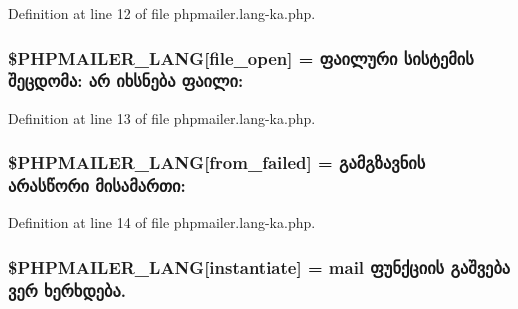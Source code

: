 Definition at line 12 of file phpmailer.\+lang-\/ka.\+php.

\subsubsection[{\texorpdfstring{\$\+P\+H\+P\+M\+A\+I\+L\+E\+R\+\_\+\+L\+A\+NG}{$PHPMAILER_LANG}}]{\setlength{\rightskip}{0pt plus 5cm}\$P\+H\+P\+M\+A\+I\+L\+E\+R\+\_\+\+L\+A\+NG\mbox{[}\textquotesingle{}file\+\_\+open\textquotesingle{}\mbox{]} = \textquotesingle{}ფაილური სისტემის შეცდომა\+: არ იხსნება ფაილი\+: \textquotesingle{}}\hypertarget{phpmailer_8lang-ka_8php_a28d1a6517bf4c942a0ddd506188ad2e0}{}\label{phpmailer_8lang-ka_8php_a28d1a6517bf4c942a0ddd506188ad2e0}


Definition at line 13 of file phpmailer.\+lang-\/ka.\+php.

\subsubsection[{\texorpdfstring{\$\+P\+H\+P\+M\+A\+I\+L\+E\+R\+\_\+\+L\+A\+NG}{$PHPMAILER_LANG}}]{\setlength{\rightskip}{0pt plus 5cm}\$P\+H\+P\+M\+A\+I\+L\+E\+R\+\_\+\+L\+A\+NG\mbox{[}\textquotesingle{}from\+\_\+failed\textquotesingle{}\mbox{]} = \textquotesingle{}გამგზავნის არასწორი მისამართი\+: \textquotesingle{}}\hypertarget{phpmailer_8lang-ka_8php_adf832ae12155a09be077c6d5e4fd7e22}{}\label{phpmailer_8lang-ka_8php_adf832ae12155a09be077c6d5e4fd7e22}


Definition at line 14 of file phpmailer.\+lang-\/ka.\+php.

\subsubsection[{\texorpdfstring{\$\+P\+H\+P\+M\+A\+I\+L\+E\+R\+\_\+\+L\+A\+NG}{$PHPMAILER_LANG}}]{\setlength{\rightskip}{0pt plus 5cm}\$P\+H\+P\+M\+A\+I\+L\+E\+R\+\_\+\+L\+A\+NG\mbox{[}\textquotesingle{}instantiate\textquotesingle{}\mbox{]} = \textquotesingle{}mail ფუნქციის გაშვება ვერ ხერხდება.\textquotesingle{}}\hypertarget{phpmailer_8lang-ka_8php_ad58dde16780f4770ccf4dd282ea1f5ad}{}\label{phpmailer_8lang-ka_8php_ad58dde16780f4770ccf4dd282ea1f5ad}


